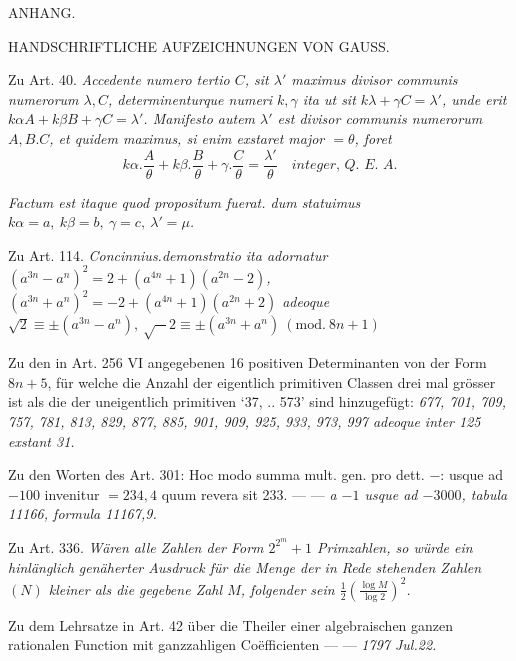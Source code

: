 
\begin{center}ANHANG.\end{center}

\begin{center}\small HANDSCHRIFTLICHE AUFZEICHNUNGEN VON GAUSS.\end{center}


Zu Art. 40. \textit{Accedente numero tertio \(C\), sit \(\lambda'\) maximus divisor communis numerorum \(\lambda,C\), determinenturque numeri \(k,\gamma\) ita ut sit \(k\lambda+\gamma C=\lambda'\), unde erit \(k\alpha A+k\beta B+\gamma C=\lambda'\). Manifesto autem \(\lambda'\) est divisor communis numerorum \(A,B.C\), et quidem maximus, si enim exstaret major \(=\theta\), foret \[k\alpha.\frac{A}{\theta}+k\beta.\frac{B}{\theta}+\gamma.\frac{C}{\theta}=\frac{\lambda'}{\theta}\quad\textit{integer, Q. E. A.}\]}


\textit{Factum est itaque quod propositum fuerat. dum statuimus \(k\alpha=a,\ k\beta=b,\ \gamma=c,\ \lambda'=\mu\).}


Zu Art. 114. \textit{Concinnius.demonstratio ita adornatur \((a^{3n}-a^n)^2=2+(a^{4n}+1)(a^{2n}-2)\), \((a^{3n}+a^n)^2=-2+(a^{4n}+1)(a^{2n}+2)\) adeoque \(\surd2\equiv\pm(a^{3n}-a^n),\ \surd-2\equiv\pm(a^{3n}+a^n)\ (\mathrm{mod.}\ 8n+1)\)}


Zu den in Art. 256 VI angegebenen 16 positiven Determinanten von der Form \(8n+5\), für welche die Anzahl der eigentlich primitiven Classen drei mal grösser ist als die der uneigentlich primitiven ‘37, .. 573’ sind hinzugefügt: \textit{677, 701, 709, 757, 781, 813, 829, 877, 885, 901, 909, 925, 933, 973, 997 adeoque inter 125 exstant 31.}


Zu den Worten des Art. 301: Hoc modo summa mult. gen. pro dett. \(-\): usque ad \(-100\) invenitur \(=234,4\) quum revera sit 233. — — \textit{a \(-1\) usque ad \(-3000\), tabula 11166, formula 11167,9.}


Zu Art. 336. \textit{Wären alle Zahlen der Form \(2^{2^m}+1\) Primzahlen, so würde ein hinlänglich genäherter Ausdruck für die Menge der in Rede stehenden Zahlen \((N)\) kleiner als die gegebene Zahl \(M\), folgender sein \(\frac12\left(\frac{\log M}{\log2}\right)^2\).}


Zu dem Lehrsatze in Art. 42 über die Theiler einer algebraischen ganzen rationalen Function mit ganzzahligen Coëfficienten — — \textit{1797 Jul.22.}


